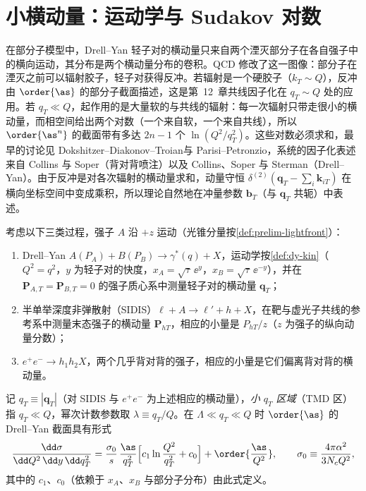 \section{小横动量：运动学与 Sudakov 对数}\label{sec:tmd-kinematics}

在部分子模型中，Drell--Yan 轻子对的横动量只来自两个湮灭部分子在各自强子中的横向运动，其分布是两个横动量分布的卷积。QCD 修改了这一图像：部分子在湮灭之前可以辐射胶子，轻子对获得反冲。若辐射是一个硬胶子（$k_T\sim Q$），反冲由 $\order{\as}$ 的部分子截面描述，这是第~12~章共线因子化在 $q_T\sim Q$ 处的应用。若 $q_T\ll Q$，起作用的是大量软的与共线的辐射：每一次辐射只带走很小的横动量，而相空间给出两个对数（一个来自软，一个来自共线），所以 $\order{\as^n}$ 的截面带有多达 $2n-1$ 个 $\ln(Q^2/q_T^2)$。这些对数必须求和，最早的讨论见 Dokshitzer--Diakonov--Troian\cite{DokshitzerDiakonovTroian1978}与 Parisi--Petronzio\cite{ParisiPetronzio1979}，系统的因子化表述来自 Collins 与 Soper（背对背喷注\cite{CollinsSoper1981}）以及 Collins、Soper 与 Sterman（Drell--Yan\cite{CollinsSoperSterman1985a}）。由于反冲是对各次辐射的横动量求和，动量守恒 $\delta^{(2)}(\mathbf q_T-\sum_i\mathbf k_{iT})$ 在横向坐标空间中变成乘积，所以理论自然地在冲量参数 $\mathbf b_T$（与 $\mathbf q_T$ 共轭）中表述。

\begin{definition}[小 $q_T$ 区域]\label{def:tmd-kin}
考虑以下三类过程，强子 $A$ 沿 $+z$ 运动（光锥分量按\cref{def:prelim-lightfront}）：
\begin{enumerate}[label=(\roman*),leftmargin=2.2em,itemsep=1pt,topsep=2pt]
\item Drell--Yan $A(P_A)+B(P_B)\to\gamma^*(q)+X$，运动学按\cref{def:dy-kin}（$Q^2=q^2$，$y$ 为轻子对的快度，$x_A=\sqrt\tau\,\ee^{y}$，$x_B=\sqrt\tau\,\ee^{-y}$），并在 $\mathbf P_{A,T}=\mathbf P_{B,T}=0$ 的强子质心系中测量轻子对的横动量 $\mathbf q_T$；
\item 半单举深度非弹散射（SIDIS）$\ell+A\to\ell'+h+X$，在靶与虚光子共线的参考系中测量末态强子的横动量 $\mathbf P_{hT}$，相应的小量是 $P_{hT}/z$（$z$ 为强子的纵向动量分数）；
\item $e^+e^-\to h_1h_2X$，两个几乎背对背的强子，相应的小量是它们偏离背对背的横动量。
\end{enumerate}
记 $q_T\equiv|\mathbf q_T|$（对 SIDIS 与 $e^+e^-$ 为上述相应的横动量），\emph{小 $q_T$ 区域}（TMD 区）指 $q_T\ll Q$，幂次计数参数取 $\lambda\equiv q_T/Q$。在 $\Lambda\ll q_T\ll Q$ 时 $\order{\as}$ 的 Drell--Yan 截面具有形式
\begin{equation}\label{eq:tmd-kin-c1c0}
\frac{\dd\sigma}{\dd Q^2\,\dd y\,\dd q_T^2}=\frac{\sigma_0}{s}\,\frac{\as}{q_T^2}\Big[c_1\ln\frac{Q^2}{q_T^2}+c_0\Big]+\order{\frac{\as}{Q^2}},\qquad \sigma_0\equiv\frac{4\pi\alpha^2}{3N_cQ^2},
\end{equation}
其中的 $c_1$、$c_0$（依赖于 $x_A$、$x_B$ 与部分子分布）由此式定义。
\end{definition}

